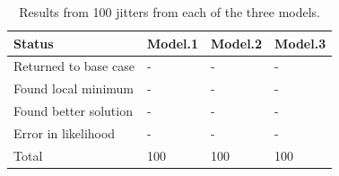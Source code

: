 \documentclass[12pt,]{article}
\begin{document}
\newpage

\begin{table}[ht]
\centering
\caption{Results from 100 jitters from each of 
                                      the three models.} 
\label{tab:jitter}
\begin{tabular}{llll}
  \hline
Status & Model.1 & Model.2 & Model.3 \\ 
  \hline
Returned to base case & - & - & - \\ 
  Found local minimum & - & - & - \\ 
  Found better solution & - & - & - \\ 
  Error in likelihood & - & - & - \\ 
  Total & 100 & 100 & 100 \\ 
   \hline
\end{tabular}
\end{table}

\FloatBarrier

\newpage
\end{document}
